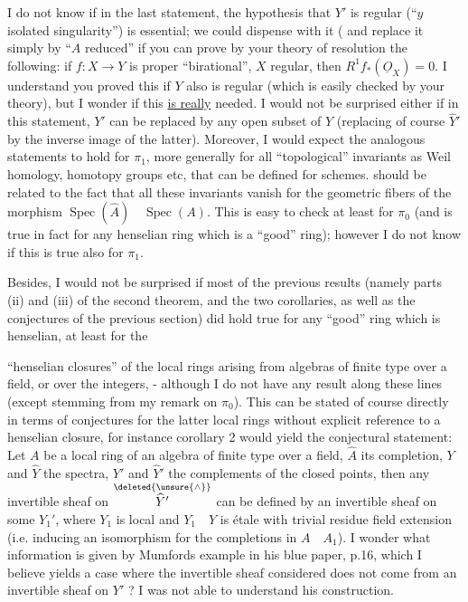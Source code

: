 I do not know if in the last statement, the hypothesis that $Y'$ is regular (``$y$ isolated singularity'') is essential; we could dispense with it ( and replace it simply by ``$A$ reduced'' if you can prove by your theory of resolution the following: if $f:X\rightarrow Y$ is proper ``birational'', $X$ regular, then $R^1f_*(\underline{O}_X)=0$. I understand you proved this if $Y$ also is regular (which is easily checked by your theory), but I wonder if this \uline{is really} needed. I would not be surprised either if in this statement, $Y'$ can be replaced by any open subset of $Y$ (replacing of course $\widehat{Y}'$ by the inverse image of the latter). Moreover, I would expect the analogous statements to hold for $\pi_1$, more generally for all ``topological'' invariants as Weil homology, homotopy groups etc, that can be defined for schemes.  should be related to the fact that all these invariants vanish for the geometric fibers of the morphism $\operatorname{Spec}(\widehat{A})\quad\operatorname{Spec}(A)$. This is easy to check at least for $\pi_0$ (and is true in fact for any henselian ring which is a ``good'' ring); however I do not know if this is true also for $\pi_1$.

Besides, I would not be surprised if most of the previous results (namely parts (ii) and (iii) of the second theorem, and the two corollaries, as well as the  conjectures of the previous section) did hold true for any ``good'' ring which is henselian,  at least for the



``henselian closures'' of the local rings arising from algebras of finite type over a field, or over the integers, - although I do not have any result along these lines (except  stemming from my remark on $\pi_0$).  This can be stated of course directly in terms of conjectures for the latter local rings without explicit reference to a henselian closure, for instance corollary 2 would yield the conjectural statement: Let $A$ be a local  ring of an algebra of finite type over a field, $\widehat{A}$ its completion, $Y$ and $\widehat{Y}$ the spectra, $Y'$ and $\widehat{Y}'$ the complements of the closed points,  then any invertible sheaf on $\overset{\deleted{\unsure{\wedge}}}{\widehat{Y}'}$ can be defined by an invertible sheaf on some $Y_1'$, where $Y_1$ is local and $Y_1\quad Y$ is étale with trivial residue field extension (i.e. inducing an isomorphism for the completions in $A\quad A_1$). I wonder what information is given by Mumfords example in his blue paper, p.16, which I believe yields a case where the invertible sheaf considered does not come from an invertible sheaf on $Y'$ ? I  was not able to understand his construction.

